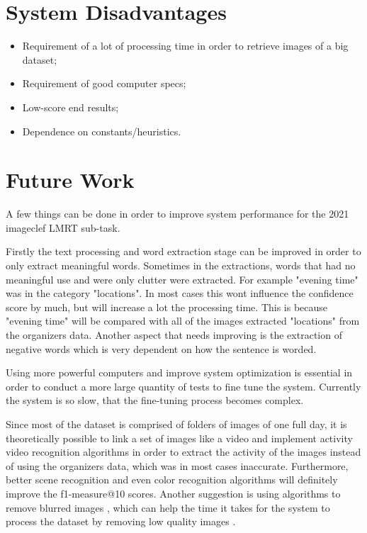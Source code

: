 \section{System Disadvantages}

\begin{itemize}
    \itemsep0em
    \item Requirement of a lot of processing time in order to retrieve images of a big dataset;
    \item Requirement of  good computer specs;
    \item Low-score end results;
    \item Dependence on constants/heuristics.
\end{itemize}

\section{Future Work}

A few things can be done in order to improve system performance for the 2021 imageclef LMRT sub-task.

Firstly the text processing and word extraction stage can be improved in order to only extract meaningful words. Sometimes in the extractions, words that had no meaningful use and were only clutter were extracted. For example "evening time" was in the category "locations". In most cases this wont influence the confidence score by much, but will increase a lot the processing time. This is because "evening time" will be compared with all of the images extracted "locations" from the organizers data. Another aspect that needs improving is the extraction of negative words which is very dependent on how the sentence is worded.

Using more powerful computers and improve system optimization is essential in order to conduct a more large quantity of tests to fine tune the system. Currently the system is so slow, that the fine-tuning process becomes complex.

Since most of the dataset is comprised of folders of images of one full day, it is theoretically possible to link a set of images like a video and implement activity video recognition algorithms in order to extract the activity of the images instead of using the organizers data, which was in most cases inaccurate. Furthermore, better scene recognition and even color recognition algorithms will definitely improve the f1-measure@10 scores. Another suggestion is using algorithms to remove blurred images , which can help the time it takes for the system to process the dataset by removing low quality images .

